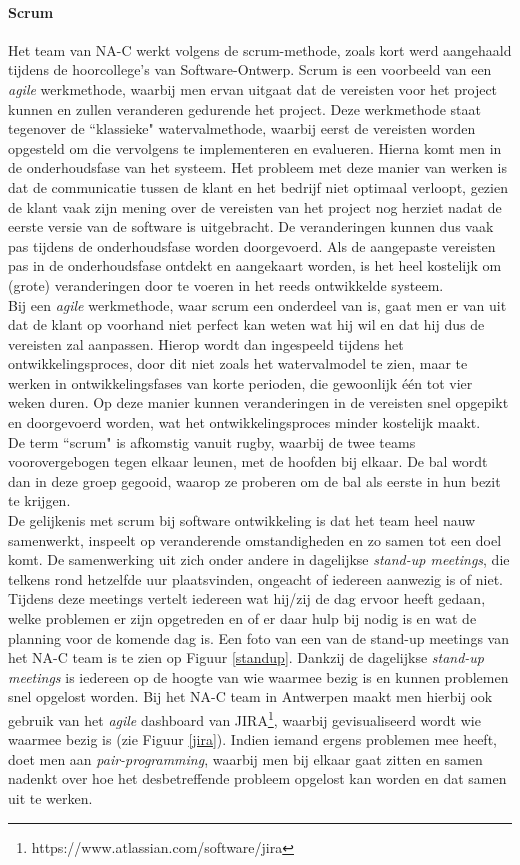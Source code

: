\documentclass[10pt,a4paper]{article}
\begin{document}
\paragraph{Scrum}
Het team van NA-C werkt volgens de scrum-methode, zoals kort werd aangehaald tijdens de hoorcollege's van Software-Ontwerp. Scrum is een voorbeeld van een \textit{agile} werkmethode, waarbij men ervan uitgaat dat de vereisten voor het project kunnen en zullen veranderen gedurende het project. Deze werkmethode staat tegenover de ``klassieke" watervalmethode, waarbij eerst de vereisten worden opgesteld om die vervolgens te implementeren en evalueren. Hierna komt men in de onderhoudsfase van het systeem. Het probleem met deze manier van werken is dat de communicatie tussen de klant en het bedrijf niet optimaal verloopt, gezien de klant vaak zijn mening over de vereisten van het project nog herziet nadat de eerste versie van de software is uitgebracht. De veranderingen kunnen dus vaak pas tijdens de onderhoudsfase worden doorgevoerd. Als de aangepaste vereisten pas in de onderhoudsfase ontdekt en aangekaart worden, is het heel kostelijk om (grote) veranderingen door te voeren in het reeds ontwikkelde systeem.\\
Bij een \textit{agile} werkmethode, waar scrum een onderdeel van is, gaat men er van uit dat de klant op voorhand niet perfect kan weten wat hij wil en dat hij dus de vereisten zal aanpassen. Hierop wordt dan ingespeeld tijdens het ontwikkelingsproces, door dit niet zoals het watervalmodel te zien, maar te werken in ontwikkelingsfases van korte perioden, die gewoonlijk \'e\'en tot vier weken duren. Op deze manier kunnen veranderingen in de vereisten snel opgepikt en doorgevoerd worden, wat het ontwikkelingsproces minder kostelijk maakt.\\
De term ``scrum" is afkomstig vanuit rugby, waarbij de twee teams voorovergebogen tegen elkaar leunen, met de hoofden bij elkaar. De bal wordt dan in deze groep gegooid, waarop ze proberen om de bal als eerste in hun bezit te krijgen.\\
De gelijkenis met scrum bij software ontwikkeling is dat het team heel nauw samenwerkt, inspeelt op veranderende omstandigheden en zo samen tot een doel komt. De samenwerking uit zich onder andere in dagelijkse \textit{stand-up meetings}, die telkens rond hetzelfde uur plaatsvinden, ongeacht of iedereen aanwezig is of niet. Tijdens deze meetings vertelt iedereen wat hij/zij de dag ervoor heeft gedaan, welke problemen er zijn opgetreden en of er daar hulp bij nodig is en wat de planning voor de komende dag is. Een foto van een van de stand-up meetings van het NA-C team is te zien op Figuur \ref{standup}. Dankzij de dagelijkse \textit{stand-up meetings} is iedereen op de hoogte van wie waarmee bezig is en kunnen problemen snel opgelost worden. Bij het NA-C team in Antwerpen maakt men hierbij ook gebruik van het \textit{agile} dashboard van JIRA\footnote{https://www.atlassian.com/software/jira}, waarbij gevisualiseerd wordt wie waarmee bezig is (zie Figuur \ref{jira}). Indien iemand ergens problemen mee heeft, doet men aan \textit{pair-programming}, waarbij men bij elkaar gaat zitten en samen nadenkt over hoe het desbetreffende probleem opgelost kan worden en dat samen uit te werken.\\
\end{document}
